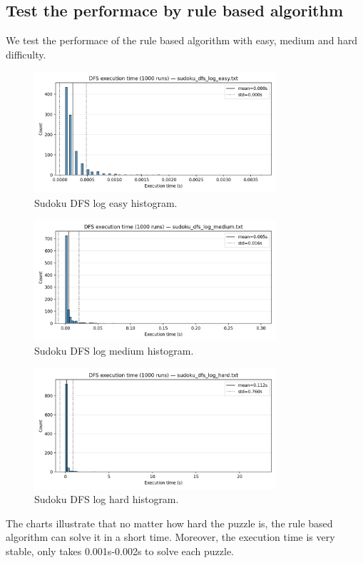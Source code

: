 \subsection{Test the performace by rule based algorithm}

We test the performace of the rule based algorithm with easy, medium and hard difficulty.

\begin{figure}[h]
\centering
\includegraphics[width=0.8\textwidth]{resources/sudoku_dfs_log_easy_histogram.png}
\caption{Sudoku DFS log easy histogram.}
\label{fig:sudoku_dfs_log_easy_histogram}
\end{figure}

\begin{figure}[h]
\centering
\includegraphics[width=0.8\textwidth]{resources/sudoku_dfs_log_medium_histogram.png}
\caption{Sudoku DFS log medium histogram.}
\label{fig:sudoku_dfs_log_medium_histogram}
\end{figure}

\begin{figure}[h]
\centering
\includegraphics[width=0.8\textwidth]{resources/sudoku_dfs_log_hard_histogram.png}
\caption{Sudoku DFS log hard histogram.}
\label{fig:sudoku_dfs_log_hard_histogram}
\end{figure}

The charts illustrate that no matter how hard the puzzle is, the rule based algorithm can solve it in a short time. Moreover, the execution time is very stable, only takes 0.001s-0.002s to solve each puzzle.
